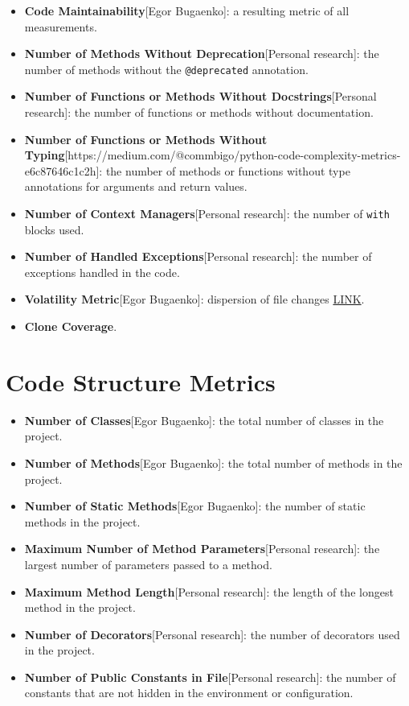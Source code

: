 \documentclass{article}
\begin{document}
\begin{itemize}
    \item \textbf{Code Maintainability}[Egor Bugaenko]: a resulting metric of all measurements.
    \item \textbf{Number of Methods Without Deprecation}[Personal research]: the number of methods without the \texttt{@deprecated} annotation.
    \item \textbf{Number of Functions or Methods Without Docstrings}[Personal research]: the number of functions or methods without documentation.
    \item \textbf{Number of Functions or Methods Without Typing}[https://medium.com/@commbigo/python-code-complexity-metrics-e6c87646c1c2h]: the number of methods or functions without type annotations for arguments and return values.
    \item \textbf{Number of Context Managers}[Personal research]: the number of \texttt{with} blocks used.
    \item \textbf{Number of Handled Exceptions}[Personal research]: the number of exceptions handled in the code.
    \item \textbf{Volatility Metric}[Egor Bugaenko]: dispersion of file changes \href{https://youtu.be/zN0gX9m6a2k?si=ACzi11hjNT9S82Qu&t=1956}{LINK}.
    \item \textbf{Clone Coverage}.
\end{itemize}

\section{Code Structure Metrics}

\begin{itemize}
    \item \textbf{Number of Classes}[Egor Bugaenko]: the total number of classes in the project.
    \item \textbf{Number of Methods}[Egor Bugaenko]: the total number of methods in the project.
    \item \textbf{Number of Static Methods}[Egor Bugaenko]: the number of static methods in the project.
    \item \textbf{Maximum Number of Method Parameters}[Personal research]: the largest number of parameters passed to a method.
    \item \textbf{Maximum Method Length}[Personal research]: the length of the longest method in the project.
    \item \textbf{Number of Decorators}[Personal research]: the number of decorators used in the project.
    \item \textbf{Number of Public Constants in File}[Personal research]: the number of constants that are not hidden in the environment or configuration.
\end{itemize}
\end{document}
